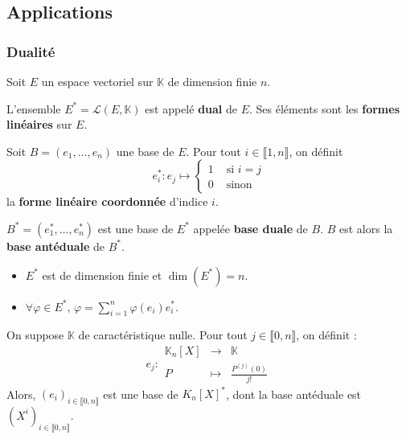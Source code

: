   \subsection{Applications}

  \subsubsection{Dualité}

  Soit $E$ un espace vectoriel sur $\mathbb{K}$ de dimension finie $n$.

  \begin{definition}
    L'ensemble $E^* = \mathcal{L}(E, \mathbb{K})$ est appelé \textbf{dual} de $E$. Ses éléments sont les \textbf{formes linéaires} sur $E$.
  \end{definition}

  \begin{definition}
    Soit $B = (e_1, \dots, e_n)$ une base de $E$. Pour tout $i \in \llbracket 1, n \rrbracket$, on définit
    \[
    e_i^* : e_j \mapsto
    \begin{cases}
      1 &\text{ si } i = j \\
      0 &\text{ sinon}
    \end{cases}
    \]
    la \textbf{forme linéaire coordonnée} d'indice $i$.
  \end{definition}

  \begin{theorem}
    $B^* = (e_1^*, \dots, e_n^*)$ est une base de $E^*$ appelée \textbf{base duale} de $B$. $B$ est alors la \textbf{base antéduale} de $B^*$.
  \end{theorem}

  \begin{corollary}
    \begin{itemize}
      \item $E^*$ est de dimension finie et $\dim(E^*) = n$.
      \item $\forall \varphi \in E^*, \, \varphi = \sum_{i=1}^n \varphi(e_i) e_i^*$.
    \end{itemize}
  \end{corollary}


  \begin{application}
    On suppose $\mathbb{K}$ de caractéristique nulle. Pour tout $j \in \llbracket 0, n \rrbracket$, on définit :
    \[
      e_j : \begin{array}{ccc}
        \mathbb{K}_n[X] &\rightarrow& \mathbb{K} \\
        P &\mapsto& \frac{P^{(j)}(0)}{j!}
      \end{array}
    \]
    Alors, $(e_i)_{i \in \llbracket 0, n \rrbracket}$ est une base de $K_n[X]^*$, dont la base antéduale est $(X^i)_{i \in \llbracket 0, n \rrbracket}$.
  \end{application}

